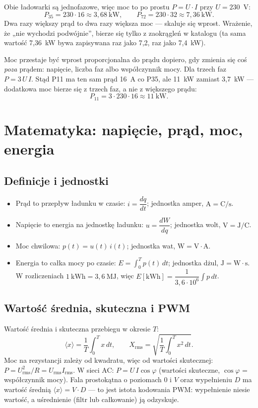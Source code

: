 \documentclass[11pt]{article}
\begin{document}
Obie ładowarki są jednofazowe, więc moc to po prostu \(P=U\cdot I\) przy \(U=230\)~V:
\[
P_{35}=230\cdot 16 \approx 3{,}68\ \mathrm{kW},\qquad
P_{72}=230\cdot 32 \approx 7{,}36\ \mathrm{kW}.
\]
Dwa razy większy prąd to dwa razy większa moc --- skaluje się wprost. Wrażenie, że „nie wychodzi podwójnie'', bierze się tylko z zaokrągleń w katalogu (ta sama wartość 7{,}36~kW bywa zapisywana raz jako 7{,}2, raz jako 7{,}4~kW).

Moc przestaje być wprost proporcjonalna do prądu dopiero, gdy zmienia się coś \emph{poza} prądem: napięcie, liczba faz albo współczynnik mocy. Dla trzech faz \(P=3\,U\,I\). Stąd P11 ma ten sam prąd 16~A co P35, ale 11~kW zamiast 3{,}7~kW --- dodatkowa moc bierze się z trzech faz, a nie z większego prądu:
\[
P_{11}=3\cdot 230\cdot 16 \approx 11\ \mathrm{kW}.
\]

\section{Matematyka: napięcie, prąd, moc, energia}

\subsection{Definicje i jednostki}
\begin{itemize}
 \item Prąd to przepływ ładunku w czasie: \( i=\dfrac{dq}{dt}\); jednostka amper, \(\mathrm{A=C/s}\).
 \item Napięcie to energia na jednostkę ładunku: \( u=\dfrac{dW}{dq}\); jednostka wolt, \(\mathrm{V=J/C}\).
 \item Moc chwilowa: \( p(t)=u(t)\,i(t)\); jednostka wat, \(\mathrm{W=V\cdot A}\).
 \item Energia to całka mocy po czasie: \( E=\displaystyle\int_0^T p(t)\,dt\); jednostka dżul, \(\mathrm{J=W\cdot s}\). W rozliczeniach \(1~\mathrm{kWh}=3{,}6~\mathrm{MJ}\), więc \( E[\mathrm{kWh}]=\dfrac{1}{3{,}6\cdot10^{6}}\displaystyle\int p\,dt\).
\end{itemize}

\subsection{Wartość średnia, skuteczna i PWM}
Wartość średnia i skuteczna przebiegu w okresie \(T\):
\[
\langle x\rangle=\frac1T\int_0^T x\,dt,\qquad
X_{\mathrm{rms}}=\sqrt{\frac1T\int_0^T x^2\,dt}.
\]
Moc na rezystancji zależy od kwadratu, więc od wartości skutecznej: \(P=U_{\mathrm{rms}}^2/R=U_{\mathrm{rms}}I_{\mathrm{rms}}\). W sieci AC: \(P=U\,I\cos\varphi\) (wartości skuteczne, \(\cos\varphi\) = współczynnik mocy). Fala prostokątna o poziomach \(0\) i \(V\) oraz wypełnieniu \(D\) ma wartość średnią \(\langle x\rangle = V\cdot D\) --- to jest istota kodowania PWM: wypełnienie niesie wartość, a uśrednienie (filtr lub całkowanie) ją odzyskuje.
\end{document}
